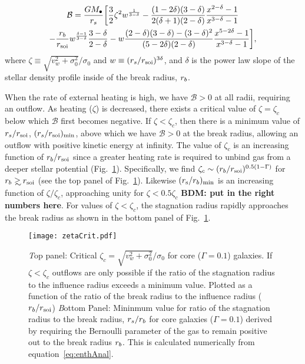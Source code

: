 \begin{multline}
  \mathcal{B} =\frac{G M_{\bullet}}{r_s} \biggl[ \frac{3}{2} \zeta^2
  w^{\frac{1}{3 -\delta}}
  -\frac{(1-2\delta)(3-\delta)}{2(\delta+1)(2-\delta)}  \frac{x^{2  -\delta}-1}{x^{3-\delta}-1}\\
  -\frac{r_b}{r_{\rm soi}} w^{\frac{\delta-1}{3-\delta}} \frac{3 -\delta}{2
    -\delta} -w
  \frac{(2-\delta)(3-\delta)-(3-\delta)^{2}}{(5-2\delta)(2-\delta)}
  \frac{x^{5-2\delta}-1}{x^{3-\delta}-1} \biggr],
\label{eq:enthAnal}
\end{multline}
where $\zeta \equiv \sqrt{v_w^2+\sigma_0^2}/\sigma_0$ and $w\equiv
(r_s/r_{\rm soi})^{3\delta}$, and $\delta$ is the power law slope of the
stellar density profile inside of the break radius, $r_b$.

When the rate of external heating is high, we have $\mathcal{B} > 0$
at all radii, requiring an outflow.  As heating ($\zeta$) is
decreased, there exists a critical value of $\zeta = \zeta_{c}$ below
which $\mathcal{B}$ first becomes negative.  If $\zeta<\zeta_c$, then
there is a minimum value of $r_s/r_{\rm soi}$, $(r_s/r_{\rm soi})_{\rm min}$,
above which we have $\mathcal{B} > 0$ at the break radius, allowing an
outflow with positive kinetic energy at infinity.  The value of
$\zeta_c$ is an increasing function of $r_{b}/r_{\rm soi}$ since a
greater heating rate is required to unbind gas from a deeper stellar
potential (Fig.~\ref{fig:zetaCrit}).  Specifically, we find
$\zeta_c\sim (r_b/r_{\rm soi})^{0.5(1-\Gamma)}$ for $\rb\gsim\rsoi$ (see the
top panel of Fig.~\ref{fig:zetaCrit}). Likewise $(r_{\rm
  s}/r_{b})_{\rm min}$ is an increasing function of $\zeta/\zeta_{c}$,
approaching unity for $\zeta < 0.5\zeta_c$ {\bf BDM: put in the right
  numbers here}.  For values of $\zeta<\zeta_c$, the stagnation radius
rapidly approaches the break radius as shown in the bottom panel of
Fig.~\ref{fig:zetaCrit}.

\begin{figure}
\texttt{[image: zetaCrit.pdf]}
\caption{\label{fig:zetaCrit} {\emph Top panel:} Critical
  $\zeta_c=\sqrt{v_w^2+\sigma_0^2}/\sigma_0$ for core ($\Gamma=0.1$)
  galaxies. If $\zeta<\zeta_c$ outflows are only possible if the ratio
  of the stagnation radius to the influence radius exceeds a minimum
  value. Plotted as a function of the ratio of the break radius to the
  influence radius ($r_b/r_{\rm soi}$) {\emph Bottom Panel:} Mininmum value
  for ratio of the stagnation radius to the break radius, $r_s/r_b$
  for core galaxies ($\Gamma=0.1$) derived by requiring the Bernoulli
  parameter of the gas to remain positive out to the break radius
  $r_b$. This is calculated numerically from
  equation~\eqref{eq:enthAnal}.}
\end{figure}


